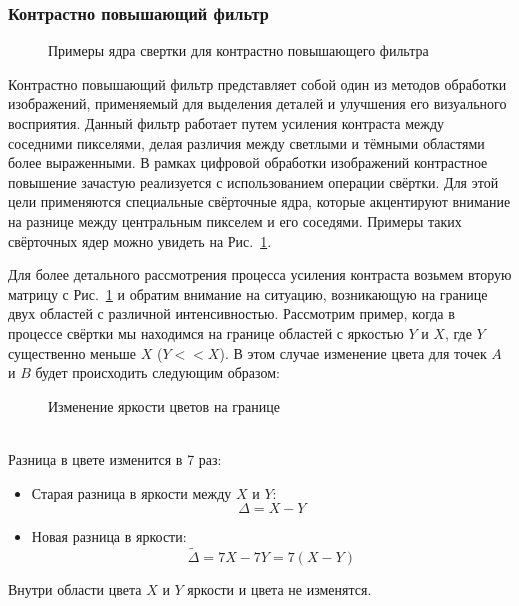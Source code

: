 \subsubsection{Контрастно повышающий фильтр}

\begin{figure}[h]
    \centering
    
    \caption{Примеры ядра свертки для контрастно повышающего фильтра}
    \label{fig:sharpen_filter}
\end{figure}

Контрастно повышающий фильтр представляет собой один из методов обработки изображений, применяемый для выделения деталей и улучшения его визуального восприятия. Данный фильтр работает путем усиления контраста между соседними пикселями, делая различия между светлыми и тёмными областями более выраженными. В рамках цифровой обработки изображений контрастное повышение зачастую реализуется с использованием операции свёртки. Для этой цели применяются специальные свёрточные ядра, которые акцентируют внимание на разнице между центральным пикселем и его соседями. Примеры таких свёрточных ядер можно увидеть на Рис.~\ref{fig:sharpen_filter}.

Для более детального рассмотрения процесса усиления контраста возьмем вторую матрицу с Рис.~\ref{fig:sharpen_filter} и обратим внимание на ситуацию, возникающую на границе двух областей с различной интенсивностью. Рассмотрим пример, когда в процессе свёртки мы находимся на границе областей с яркостью $Y$ и $X$, где $Y$ существенно меньше $X$ ($Y<<X$). В этом случае изменение цвета для точек $A$ и $B$ будет происходить следующим образом:
\\
\begin{figure}[h]
    \centering
    
    \caption{Изменение яркости цветов на границе}
    \label{fig:sharpen_on_border}
\end{figure}
\\

Разница в цвете изменится в 7 раз:
\begin{itemize}
    \item Старая разница в яркости между $X$ и $Y$:
          \[\Delta = X - Y\]
    \item Новая разница в яркости:
          \[\tilde \Delta= 7X - 7Y = 7(X - Y)\]
\end{itemize}

Внутри области цвета $X$ и $Y$ яркости и цвета не изменятся.\\

